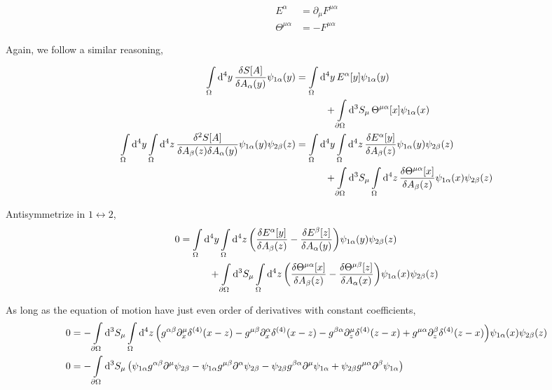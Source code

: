\begin{align}
    E^\alpha & = \partial_\mu F^{\mu\alpha}\\
    \Theta^{\mu\alpha}&=-F^{\mu\alpha}
\end{align}

Again, we follow a similar reasoning,

\begin{align}
    \int\limits_{\Omega}\dd[4]{y}\fdv{S[A]}{A_\alpha\qty(y)}\psi_{1\alpha}\qty(y)&=\int\limits_{\Omega}\dd[4]{y}E^\alpha\qty[y]\psi_{1\alpha}(y)\nonumber\\
    &\quad\quad\quad+\int\limits_{\partial\Omega}\dd[3]{S_{\mu}}\Theta^{\mu\alpha}\qty[x]\psi_{1\alpha}(x)\\
    \int\limits_{\Omega}\dd[4]{y}\int\limits_{\Omega}\dd[4]{z}\frac{\delta^2 S[A]}{\delta A_\beta\qty(z)\delta A_\alpha\qty(y)}\psi_{1\alpha}\qty(y)\psi_{2\beta}\qty(z)&=\int\limits_{\Omega}\dd[4]{y}\int\limits_{\Omega}\dd[4]{z}\fdv{E^\alpha\qty[y]}{A_\beta(z)}\psi_{1\alpha}(y)\psi_{2\beta}\qty(z)\nonumber\\
    &\quad\quad\quad+\int\limits_{\partial\Omega}\dd[3]{S_{\mu}}\int\limits_{\Omega}\dd[4]{z}\fdv{\Theta^{\mu\alpha}\qty[x]}{A_\beta\qty(z)}\psi_{1\alpha}(x)\psi_{2\beta}\qty(z)\\
\end{align}

Antisymmetrize in $1\leftrightarrow2$,
\begin{align}
    0&=\int\limits_{\Omega}\dd[4]{y}\int\limits_{\Omega}\dd[4]{z}\qty(\fdv{E^\alpha\qty[y]}{A_\beta(z)}-\fdv{E^\beta\qty[z]}{ A_\alpha(y)})\psi_{1\alpha}(y)\psi_{2\beta}\qty(z)\nonumber\\
    &\quad\quad\quad+\int\limits_{\partial\Omega}\dd[3]{S_{\mu}}\int\limits_{\Omega}\dd[4]{z}\qty(\fdv{\Theta^{\mu\alpha}\qty[x]}{A_\beta\qty(z)}-\fdv{\Theta^{\mu\beta}\qty[z]}{A_\alpha\qty(x)})\psi_{1\alpha}(x)\psi_{2\beta}\qty(z)
\end{align}

As long as the equation of motion have just even order of derivatives with constant coefficients,
\begin{align}
    0&=-\int\limits_{\partial\Omega}\dd[3]{S_{\mu}}\int\limits_{\Omega}\dd[4]{z}\qty(g^{\alpha\beta}\partial^\mu_x\delta^{(4)}\qty(x-z)-g^{\mu\beta}\partial^\alpha_x\delta^{(4)}\qty(x-z)-g^{\beta\alpha}\partial^\mu_z\delta^{(4)}\qty(z-x)+g^{\mu\alpha}\partial^\beta_z\delta^{(4)}\qty(z-x))\psi_{1\alpha}(x)\psi_{2\beta}\qty(z)\\
    0&=-\int\limits_{\partial\Omega}\dd[3]{S_{\mu}}\qty(\psi_{1\alpha}g^{\alpha\beta}\partial^\mu\psi_{2\beta}-\psi_{1\alpha}g^{\mu\beta}\partial^\alpha\psi_{2\beta}-\psi_{2\beta}g^{\beta\alpha}\partial^\mu\psi_{1\alpha}+\psi_{2\beta}g^{\mu\alpha}\partial^\beta\psi_{1\alpha})
\end{align}

